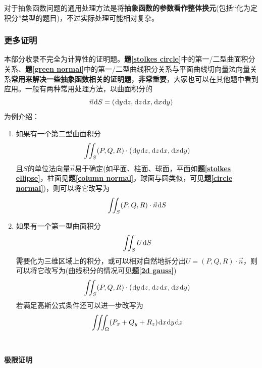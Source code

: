 \documentclass[a4paper,UTF8,fontset=windows,AutoFakeBold]{ctexart}
\newcommand*{\dr}{\hspace{0.07em}\mathrm{d}}
\newcommand*{\note}{\noindent *}
\theoremstyle{ex}
\newcommand{\exref}[1]{\textbf{题\;\ref{#1}\;}}
\begin{document}
\note 对于抽象函数问题的通用处理方法是将\textbf{抽象函数的参数看作整体换元}(包括``化为定积分''类型的题目)，不过实际处理可能相对复杂。

\subsubsection{更多证明}
本部分收录不完全为计算性的证明题。\exref{stolkes circle}中的第一/二型曲面积分关系、\exref{green normal}中的第一/二型曲线积分关系与平面曲线切向量法向量关系\textbf{常用来解决一些抽象函数相关的证明题}，\textbf{非常重要}，大家也可以在其他题中看到应用。一般有两种常用处理方法，以曲面积分的
$$\vec{n}\dr S=(\dr y\dr z,\dr z\dr x,\dr x\dr y)$$
为例介绍：
\begin{enumerate}
    \item 如果有一个第二型曲面积分
    $$\iint_S(P,Q,R)\cdot(\dr y\dr z,\dr z\dr x,\dr x\dr y)$$
    且$S$的单位法向量$\vec{n}$易于确定(如平面、柱面、球面，平面如\exref{stolkes ellipse}，柱面见\exref{column normal}，球面与圆类似，可见\exref{circle normal})，则可以将它改写为
    $$\iint_S(P,Q,R)\cdot\vec{n}\dr S$$
    \item 如果有一个第一型曲面积分
    $$\iint_SU\dr S$$
    需要化为三维区域上的积分，或可以相对自然地拆分出$U=(P,Q,R)\cdot\vec{n}$，则可以将它改写为(曲线积分的情况可见\exref{2d gauss})
    $$\iint_S(P,Q,R)\cdot(\dr y\dr z,\dr z\dr x,\dr x\dr y)$$
    若满足高斯公式条件还可以进一步改写为
    $$\iiint_\Omega(P_x+Q_y+R_z)\dr x\dr y\dr z$$
\end{enumerate}

\

\noindent\textbf{极限证明}
\end{document}
